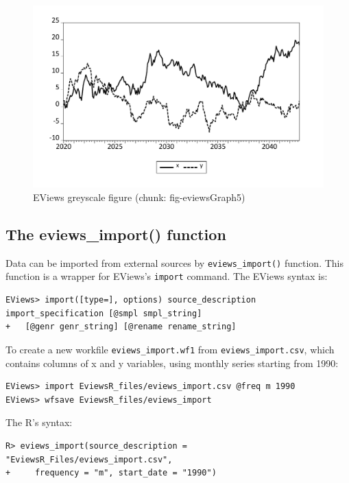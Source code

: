 \begin{figure}

{\centering \includegraphics[width=0.9\linewidth,height=0.4\textheight]{figures/eviewsgraph5-eviewsgraph5-xy} 

}

\caption{EViews greyscale figure (chunk: fig-eviewsGraph5)}\label{fig:fig-eviewsGraph5}
\end{figure}

\hypertarget{the-eviews_import-function}{%
\subsection{The eviews\_import() function}\label{the-eviews_import-function}}

Data can be imported from external sources by \texttt{eviews\_import()} function. This function is a wrapper for EViews's \texttt{import} command. The EViews syntax is:

\begin{verbatim}
EViews> import([type=], options) source_description import_specification [@smpl smpl_string] 
+   [@genr genr_string] [@rename rename_string]
\end{verbatim}

To create a new workfile \texttt{eviews\_import.wf1} from \texttt{eviews\_import.csv}, which contains columns of x and y variables, using monthly series starting from 1990:

\begin{verbatim}
EViews> import EviewsR_files/eviews_import.csv @freq m 1990
EViews> wfsave EviewsR_files/eviews_import
\end{verbatim}

The R's syntax:

\begin{verbatim}
R> eviews_import(source_description = "EviewsR_Files/eviews_import.csv",
+     frequency = "m", start_date = "1990")
\end{verbatim}

